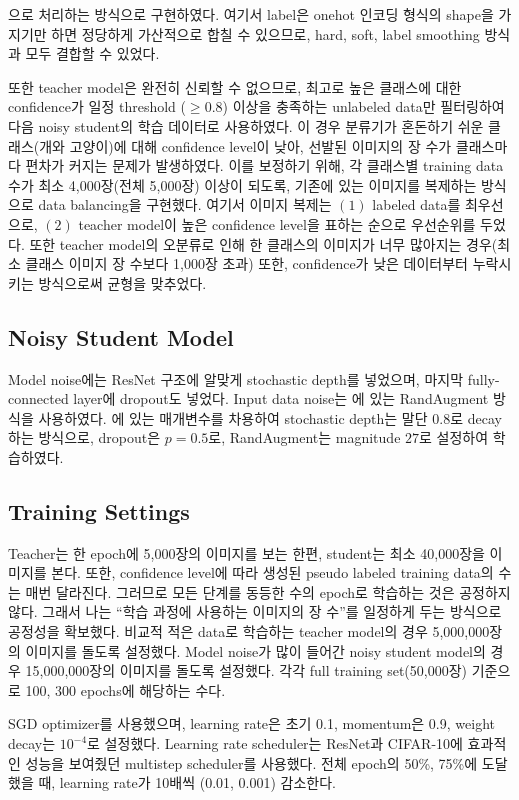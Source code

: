 으로 처리하는 방식으로 구현하였다. 여기서 label은 onehot 인코딩 형식의 shape을 가지기만 하면 정당하게 가산적으로 합칠 수 있으므로, hard, soft, label smoothing 방식과 모두 결합할 수 있었다.

또한 teacher model은 완전히 신뢰할 수 없으므로, 최고로 높은 클래스에 대한 confidence가 일정 threshold ($\geq 0.8$) 이상을 충족하는 unlabeled data만 필터링하여 다음 noisy student의 학습 데이터로 사용하였다. 이 경우 분류기가 혼돈하기 쉬운 클래스(개와 고양이)에 대해 confidence level이 낮아, 선발된 이미지의 장 수가 클래스마다 편차가 커지는 문제가 발생하였다. 이를 보정하기 위해, 각 클래스별 training data 수가 최소 4,000장(전체 5,000장) 이상이 되도록, 기존에 있는 이미지를 복제하는 방식으로 data balancing을 구현했다. 여기서 이미지 복제는 $(1)$ labeled data를 최우선으로, $(2)$ teacher model이 높은 confidence level을 표하는 순으로 우선순위를 두었다. 또한 teacher model의 오분류로 인해 한 클래스의 이미지가 너무 많아지는 경우(최소 클래스 이미지 장 수보다 1,000장 초과) 또한, confidence가 낮은 데이터부터 누락시키는 방식으로써 균형을 맞추었다.

\subsection{Noisy Student Model}
Model noise에는 ResNet 구조에 알맞게 stochastic depth를 넣었으며, 마지막 fully-connected layer에 dropout도 넣었다. Input data noise는 \cite{cubuk2019randaugment}에 있는 RandAugment 방식을 사용하였다. \cite{xie2020selftraining}에 있는 매개변수를 차용하여 stochastic depth는 말단 0.8로 decay하는 방식으로, dropout은 $p=0.5$로, RandAugment는 magnitude $27$로 설정하여 학습하였다.

\subsection{Training Settings}
Teacher는 한 epoch에 5,000장의 이미지를 보는 한편, student는 최소 40,000장을 이미지를 본다. 또한, confidence level에 따라 생성된 pseudo labeled training data의 수는 매번 달라진다. 그러므로 모든 단계를 동등한 수의 epoch로 학습하는 것은 공정하지 않다. 그래서 나는 ``학습 과정에 사용하는 이미지의 장 수''를 일정하게 두는 방식으로 공정성을 확보했다. 비교적 적은 data로 학습하는 teacher model의 경우 5,000,000장의 이미지를 돌도록 설정했다. Model noise가 많이 들어간 noisy student model의 경우 15,000,000장의 이미지를 돌도록 설정했다. 각각 full training set(50,000장) 기준으로 100, 300 epochs에 해당하는 수다.

SGD optimizer를 사용했으며, learning rate은 초기 0.1, momentum은 0.9, weight decay는 $10^{-4}$로 설정했다. Learning rate scheduler는 ResNet과 CIFAR-10에 효과적인 성능을 보여줬던 multistep scheduler를 사용했다. 전체 epoch의 50\%, 75\%에 도달했을 때, learning rate가 10배씩 (0.01, 0.001) 감소한다.